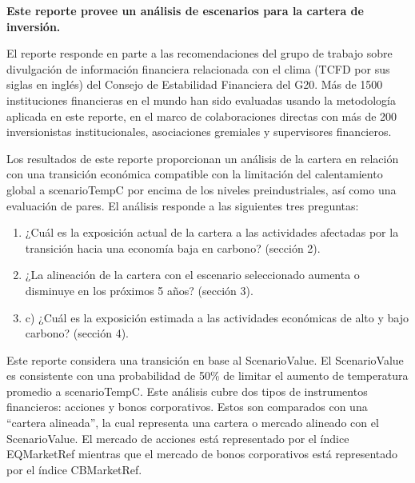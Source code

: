 \documentclass[10pt,table]{article}\usepackage[]{graphicx}\usepackage[]{color}
\begin{document}
	\begin{multicols}{2}
		\textbf{Este reporte provee un análisis de escenarios para la cartera de inversión. } 
		
		El reporte responde en parte a las recomendaciones del grupo de trabajo sobre divulgación de información financiera relacionada con el clima (TCFD por sus siglas en inglés) del Consejo de Estabilidad Financiera del G20. Más de 1500 instituciones financieras en el mundo han sido evaluadas usando la metodología aplicada en este reporte, en el marco de colaboraciones directas con más de 200 inversionistas institucionales, asociaciones gremiales y supervisores financieros.
		
		Los resultados de este reporte proporcionan un análisis de la cartera en relación con una transición económica compatible con la limitación del calentamiento global a scenarioTemp\degree C por encima de los niveles preindustriales, así como una evaluación de pares. El análisis responde a las siguientes tres preguntas:
		
		\begin{enumerate}
			\item{¿Cuál es la exposición actual de la cartera a las actividades afectadas por la transición hacia una economía baja en carbono? (sección 2).}
			\item{¿La alineación de la cartera con el escenario seleccionado aumenta o disminuye en los próximos 5 años? (sección 3).}
			\item{c)	¿Cuál es la exposición estimada a las actividades económicas de alto y bajo carbono? (sección 4).}
		\end{enumerate}
		
		Este reporte considera una transición en base al ScenarioValue. El ScenarioValue es consistente con una probabilidad de 50\% de limitar el aumento de temperatura promedio a scenarioTemp\degree C. Este análisis cubre dos tipos de instrumentos financieros: acciones y bonos corporativos. Estos son comparados con una “cartera alineada”, la cual representa una cartera o mercado alineado con el ScenarioValue. El mercado de acciones está representado por el índice EQMarketRef mientras que el mercado de bonos corporativos está representado por el índice CBMarketRef. \columnbreak
		
		
		

\end{multicols}
\end{document}
